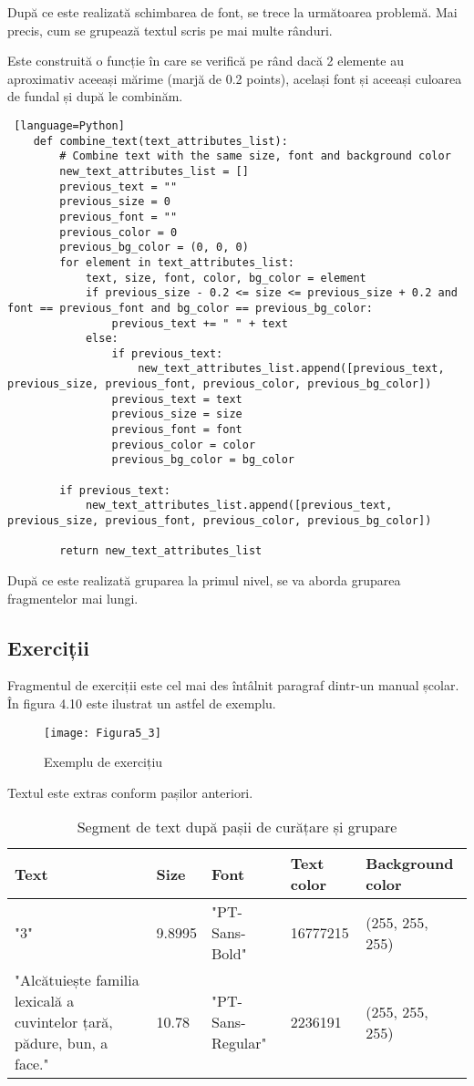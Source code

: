 După ce este realizată schimbarea de font, se trece la următoarea problemă. Mai precis, cum se grupează textul scris pe mai multe rânduri.

Este construită o funcție în care se verifică pe rând dacă 2 elemente au aproximativ aceeași mărime (marjă de 0.2 points), același font și aceeași culoarea de fundal și după le combinăm.
\vspace{1em}
\begin{lstlisting} [language=Python]
	def combine_text(text_attributes_list):
		# Combine text with the same size, font and background color
		new_text_attributes_list = []
		previous_text = ""
		previous_size = 0
		previous_font = ""
		previous_color = 0
		previous_bg_color = (0, 0, 0)
		for element in text_attributes_list:
			text, size, font, color, bg_color = element
			if previous_size - 0.2 <= size <= previous_size + 0.2 and font == previous_font and bg_color == previous_bg_color:
				previous_text += " " + text
			else:
				if previous_text:
					new_text_attributes_list.append([previous_text, previous_size, previous_font, previous_color, previous_bg_color])
				previous_text = text
				previous_size = size
				previous_font = font
				previous_color = color
				previous_bg_color = bg_color
		
		if previous_text:
			new_text_attributes_list.append([previous_text, previous_size, previous_font, previous_color, previous_bg_color])
		
		return new_text_attributes_list
\end{lstlisting}
\vspace{1em}


După ce este realizată gruparea la primul nivel, se va aborda gruparea fragmentelor mai lungi.


\subsection{Exerciții}

Fragmentul de exerciții este cel mai des întâlnit paragraf dintr-un manual școlar. În figura 4.10 este ilustrat un astfel de exemplu.
\begin{figure}[H]
	\centering
	\texttt{[image: Figura5\_3]}
	\caption{Exemplu de exercițiu}
	\label{fig:Figura5_3}
\end{figure}

Textul este extras conform pașilor anteriori.
\begin{table}[H]
	\centering
	\begin{tabular}{|p{5cm}|l|l|l|l|}
		\hline
		Text                                                                   & Size   & Font              & Text color & Background color \\ \hline
		"3"                                                                    & 9.8995 & "PT-Sans-Bold"    & 16777215   & (255, 255, 255)  \\ \hline
		"Alcătuiește familia lexicală a cuvintelor țară, pădure, bun, a face." & 10.78  & "PT-Sans-Regular" & 2236191    & (255, 255, 255)  \\ \hline
	\end{tabular}
	\caption{Segment de text după pașii de curățare și grupare}
\end{table}

